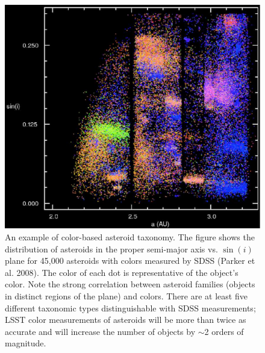 \documentclass{emulateapj}
\begin{document}
\begin{figure}
\includegraphics[width=1.0\hsize,clip]{asteroids.pdf}
\caption{An example of color-based asteroid taxonomy. The figure
shows the distribution of asteroids in the proper semi-major axis vs. $\sin(i)$
plane for 45,000 asteroids with colors measured by SDSS (Parker et al. 2008). 
The color of each dot is representative of the object's color.
Note the strong correlation between asteroid families (objects in distinct regions
of the plane) and colors. There are
at least five different taxonomic types distinguishable with SDSS measurements;
LSST color measurements of asteroids will be more than twice as accurate
and will increase the number of objects by $\sim$2 orders of magnitude.} 
\label{Fig:asteroids}
\end{figure}
\end{document}
